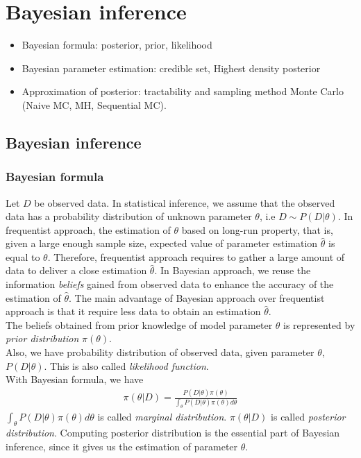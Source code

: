 \chapter{Bayesian inference}
 {\color{red}
  \begin{itemize}
        \item Bayesian formula: posterior, prior, likelihood
        \item Bayesian parameter estimation: credible set, Highest density posterior
        \item Approximation of posterior: tractability and sampling method Monte Carlo (Naive MC, MH, Sequential MC).
  \end{itemize}
 }

\section{Bayesian inference}
\subsection{Bayesian formula}
Let $D$ be observed data. In statistical inference, we assume that the observed
data has a probability distribution of unknown parameter $\theta$, i.e
$D \sim P(D|\theta)$. In frequentist approach, the estimation
of $\theta$ based on long-run property, that is, given a large enough sample
size, expected value of parameter estimation $\hat{\theta}$ is equal to
$\theta$. Therefore, frequentist approach requires to gather a large amount of
data to deliver a close estimation $\hat{\theta}$. In Bayesian approach, we
reuse the information \textit{beliefs} gained from observed data to enhance the
accuracy of the estimation of $\hat{\theta}$. The main advantage of Bayesian
approach over frequentist approach is that it require less data to obtain an
estimation $\hat{\theta}$.\\
The beliefs obtained from prior knowledge of model parameter $\theta$ is
represented by \textit{prior distribution} $\pi(\theta)$.\\
Also, we have probability distribution of observed data, given parameter
$\theta$, $P(D|\theta)$. This is also called \textit{likelihood function}.\\
With Bayesian formula, we have
\begin{align*}
      \pi(\theta | D) = \frac{P(D|\theta)\pi(\theta)}{\int_\theta P(D|\theta)\pi(\theta)d\theta}
\end{align*}
$\int_\theta P(D|\theta)\pi(\theta)d\theta$ is called \textit{marginal
      distribution}. $\pi(\theta | D)$ is called \textit{posterior distribution}.
Computing posterior distribution is the essential part of Bayesian inference,
since it gives us the estimation of parameter $\theta$.

